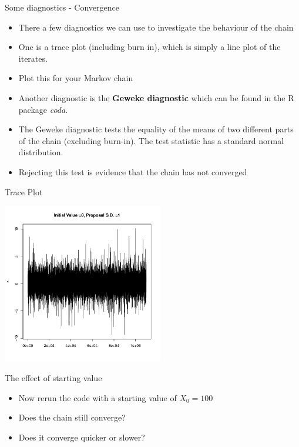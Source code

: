 \documentclass[10pt]{beamer}
\begin{document}
\begin{frame}{Some diagnostics - Convergence}
\begin{itemize}
\item There a few diagnostics we can use to investigate the behaviour of the chain

\item One is a trace plot (including burn in), which is simply a line plot of the iterates.

\item Plot this for your Markov chain

\item Another diagnostic is the {\bf Geweke diagnostic} which can be found in the R package {\em coda}.

\item The Geweke diagnostic tests the equality of the means of two different parts of the chain (excluding burn-in). The test statistic has a standard normal distribution.

\item Rejecting this test is evidence that the chain has not converged
\end{itemize}
\end{frame}
\begin{frame}{Trace Plot}
\begin{center}
\includegraphics[height=7cm]{./Pics/sp1.png}
\end{center}
\end{frame}
\begin{frame}{The effect of starting value}
\begin{itemize}
\item Now rerun the code with a starting value of $X_0=100$

\item Does the chain still converge?

\item Does it converge quicker or slower?
\end{itemize}
\end{frame}
\end{document}
